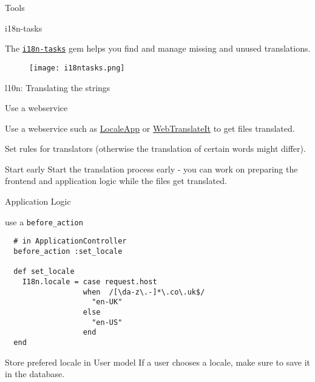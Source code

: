 \documentclass{beamer}
\begin{document}
\begin{frame}[fragile]{Tools}
\begin{block}{i18n-tasks}

The \href{https://github.com/globalize/globalize}{\lstinline{i18n-tasks}} gem helps you find and manage missing and unused translations.

\begin{figure}[ht!]
\centering
\texttt{[image: i18ntasks.png]}
\end{figure}

\end{block}
\end{frame}

\begin{frame}[fragile]{l10n: Translating the strings}
\begin{block}{Use a webservice}

Use a webservice such as \href{http://localeapp.com}{LocaleApp} or \href{http://webtranslateit.com}{WebTranslateIt} to get files translated.

Set rules for translators (otherwise the translation of certain words might differ).

\end{block}

\begin{block}{Start early}
Start the translation process early - you can work on preparing the frontend and application logic while the files get translated.
\end{block}

\end{frame}

\begin{frame}[fragile]{Application Logic}
\begin{block}{use a \lstinline{before_action}}

\begin{lstlisting}
  # in ApplicationController
  before_action :set_locale

  def set_locale
    I18n.locale = case request.host
                  when  /[\da-z\.-]*\.co\.uk$/
                    "en-UK"
                  else
                    "en-US"
                  end
  end
\end{lstlisting}

\end{block}

\begin{block}{Store prefered locale in User model}
If a user chooses a locale, make sure to save it in the database.
\end{block}

\end{frame}
\end{document}
